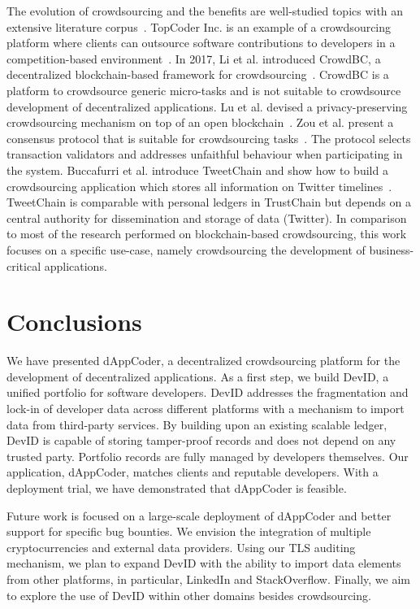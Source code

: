 The evolution of crowdsourcing and the benefits are well-studied topics with an extensive literature corpus~\cite{latoza2016crowdsourcing}.
TopCoder Inc. is an example of a crowdsourcing platform where clients can outsource software contributions to developers in a competition-based environment~\cite{lakhani2010topcoder}.
In 2017, Li et al. introduced CrowdBC, a decentralized blockchain-based framework for crowdsourcing~\cite{li2017crowdbc}.
CrowdBC is a platform to crowdsource generic micro-tasks and is not suitable to crowdsource development of decentralized applications.
Lu et al. devised a privacy-preserving crowdsourcing mechanism on top of an open blockchain~\cite{lu2018zebralancer}.
Zou et al. present a consensus protocol that is suitable for crowdsourcing tasks~\cite{zou2018proof}.
The protocol selects transaction validators and addresses unfaithful behaviour when participating in the system.
Buccafurri et al. introduce TweetChain and show how to build a crowdsourcing application which stores all information on Twitter timelines~\cite{buccafurri2017tweetchain}.
TweetChain is comparable with personal ledgers in TrustChain but depends on a central authority for dissemination and storage of data (Twitter).
In comparison to most of the research performed on blockchain-based crowdsourcing, this work focuses on a specific use-case, namely crowdsourcing the development of business-critical applications.

\section{Conclusions}
We have presented dAppCoder, a decentralized crowdsourcing platform for the development of decentralized applications.
As a first step, we build DevID, a unified portfolio for software developers.
DevID addresses the fragmentation and lock-in of developer data across different platforms with a mechanism to import data from third-party services.
By building upon an existing scalable ledger, DevID is capable of storing tamper-proof records and does not depend on any trusted party.
Portfolio records are fully managed by developers themselves.
Our application, dAppCoder, matches clients and reputable developers.
With a deployment trial, we have demonstrated that dAppCoder is feasible.

Future work is focused on a large-scale deployment of dAppCoder and better support for specific bug bounties.
We envision the integration of multiple cryptocurrencies and external data providers.
Using our TLS auditing mechanism, we plan to expand DevID with the ability to import data elements from other platforms, in particular, LinkedIn and StackOverflow.
Finally, we aim to explore the use of DevID within other domains besides crowdsourcing.